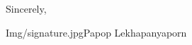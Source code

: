 
\begin{flushright}
Sincerely,
\signature{width=5cm}{Img/signature.jpg}{Papop Lekhapanyaporn}
\end{flushright}